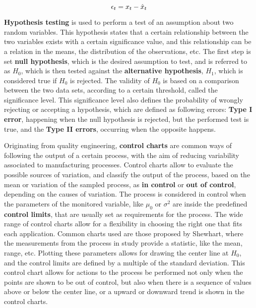 \begin {equation*}
\centering
\epsilon_t = x_t - \hat{x}_t
\end {equation*}

\par \textbf{Hypothesis testing} is used to perform a test of an assumption about two random variables. This hypothesis states that a certain relationship between
the two variables exists with a certain significance value, and this relationship can be a relation in the means, the distribution of the observations, etc. 
The first step is set \textbf{null hypothesis}, which is the desired assumption to test, and is referred to as $H_0$, which is then tested
against the \textbf{alternative hypothesis}, $H_1$, which is considered true if $H_0$ is rejected. The validity of $H_0$ is based on a comparison between the two
data sets, according to a certain threshold, called the significance level. This significance level also defines the probability of wrongly rejecting or accepting a
hypothesis, which are defined as following errors: \textbf{Type I error}, happening when the null hypothesis is rejected, but the performed test is true, and the 
\textbf{Type II errors}, occurring when the opposite happens.

\par Originating from quality engineering, \textbf{control charts} are common ways of following the output of a certain process, with the aim of reducing variability
associated to manufacturing processes. Control charts allow to evaluate the possible sources of variation, and classify the output of the process, based on the mean
or variation of the sampled process, as \textbf{in control} or \textbf{out of control}, depending on the causes of variation. The process is considered in control
when the parameters of the monitored variable, like $\mu_0$ or $\sigma^2$ are inside the predefined \textbf{control limits}, that are usually set as requirements for
the process. The wide range of control charts allow for a flexibility in choosing the right one that fits each application. Common charts used are those proposed by 
Shewhart, where the measurements from the process in study provide a statistic, like the mean, range, etc. Plotting these parameters allows for drawing the center
line at $H_0$, and the control limits are defined by a multiple of the standard deviation. This control chart allows for actions to the process be performed not only
when the points are shown to be out of control, but also when there is a sequence of values above or below the center line, or a upward or downward trend is shown in
the control charts.

